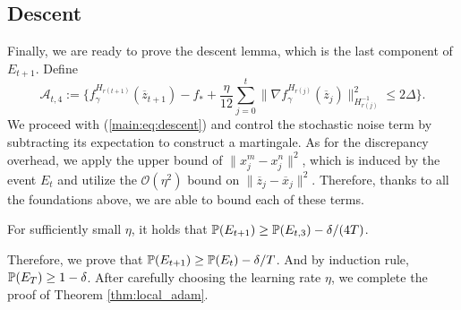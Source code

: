 \documentclass{article} %
\numberwithin{equation}{section}
\renewcommand{\eqref}[1]{(\ref{#1})}
\begin{document}
\subsection{Descent}
    Finally, we are ready to prove the descent lemma, which is the last component of $E_{t+1}$. 
    Define
    \begin{equation}
        \mathcal{A}_{t,4}:=\Big\{ f_\gamma^{H_{r(t+1)}}(\overline{z}_{t+1}) - f_*+\frac{\eta}{12}\sum_{j=0}^t\|\nabla f_\gamma^{H_{r(j)}}(\overline{z}_j)\|_{H_{r(j)}^{-1}}^2 \leq 2\Delta \Big\}.
    \end{equation}
    We proceed with \eqref{main:eq:descent}
    and control the stochastic noise term by subtracting its expectation to construct a martingale.
    As for the discrepancy overhead, we apply the upper bound of $\|x_j^m-x_j^n\|^2$, which is induced by the event $E_t$ and utilize the $\mathcal{O}(\eta^2)$ bound on $\|\overline{z}_j-\overline{x}_j\|^2$.
    Therefore, thanks to all the foundations above, we are able to bound each of these terms.
    \begin{lemma}[Informal]\label{main:lem:descent}
        For sufficiently small $\eta$, it holds that
        $\mathbb{P}(E_{t+1})\geq \mathbb{P}(E_{t,3})-\delta/(4T)$.
    \end{lemma}
    Therefore, we prove that $\mathbb{P}(E_{t+1})\geq \mathbb{P}(E_t)-\delta/T$. And by induction rule, $\mathbb{P}(E_T)\geq 1-\delta$. After carefully choosing the learning rate $\eta$, we complete the proof of Theorem \ref{thm:local_adam}. 
\end{document}
